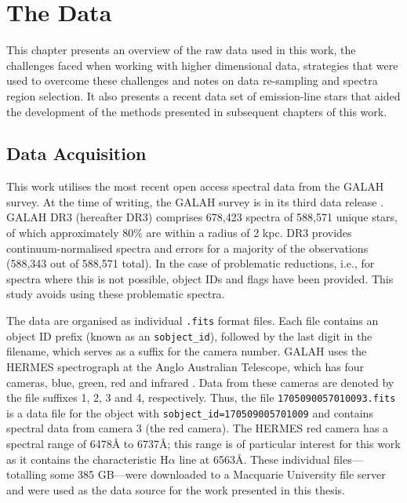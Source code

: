 \chapter{The Data}

This chapter presents an overview of the raw data used in this work, the challenges faced when working with higher dimensional data, strategies that were used to overcome these challenges and notes on data re-sampling and spectra region selection. It also presents a recent data set of emission-line stars that aided the development of the methods presented in subsequent chapters of this work.

\section{Data Acquisition}

This work utilises the most recent open access spectral data from the GALAH survey. At the time of writing, the GALAH survey is in its third data release \citep[GALAH DR3;][]{buder2021galah+}. GALAH DR3 (hereafter DR3) comprises  678,423 spectra of 588,571 unique stars, of which approximately 80\% are within a radius of 2 kpc. DR3 provides continuum-normalised spectra and errors for a majority of the observations (588,343 out of 588,571 total). In the case of problematic reductions, i.e., for spectra where this is not possible, object IDs and flags have been provided. This study avoids using these problematic spectra.

The data are organised as individual \texttt{.fits} format files. Each file contains an object ID prefix (known as an \texttt{sobject\_id}), followed by the last digit in the filename, which serves as a suffix for the camera number. GALAH uses the HERMES spectrograph at the Anglo Australian Telescope, which has four cameras, 
blue, green, red and infrared \citep{sheinis2014first}. Data from these cameras  are denoted by the file suffixes 1, 2, 3 and 4, respectively. Thus, the file \texttt{1705090057010093.fits} is a data file for the object with \texttt{sobject\_id=170509005701009} and contains spectral data from camera 3 (the red camera). 
The HERMES red camera has a spectral range of 6478\r{A} to 6737\r{A}; this range is of particular interest for this work as it contains the characteristic H$\alpha$ line at 6563\r{A}.
These individual files—totalling some 385 GB—were downloaded to a Macquarie University file server and were used as the data source for the work presented in this thesis.


